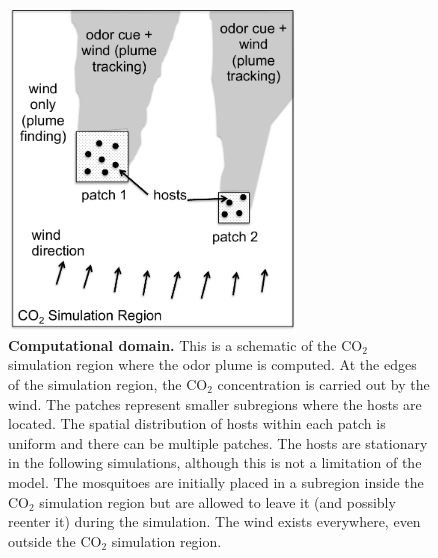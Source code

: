\documentclass[10pt]{article}
\begin{document}
\begin{center}
\begin{figure}[!htp]
\includegraphics[width=3in]{revised2figs/Figure1}
\caption{
{\bf Computational domain.}  This is a schematic of the 
CO$_2$ simulation region where the odor plume is computed.  At the edges of the simulation 
region, the CO$_2$ concentration is carried out by the wind.  
The patches represent smaller subregions where the hosts are located.  The spatial distribution 
of hosts within each patch is uniform and there can be multiple patches. The hosts are stationary in the following simulations, although this is not a limitation of the model.
The mosquitoes are initially placed in a subregion inside the CO$_2$ simulation region but are allowed to 
leave it (and possibly reenter it) during the simulation. The wind exists everywhere, even outside the CO$_2$ simulation region.}
\label{fig:setup}
\end{figure}
\end{center}
\end{document}
